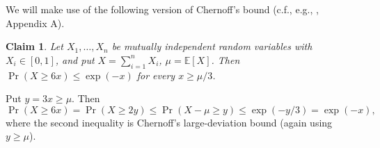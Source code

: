 \documentclass[11pt]{article}
\makeatletter
\renewenvironment{proof}[1][\proofname]
{\par\pushQED{\qed}
	\normalfont\topsep6\p@\@plus6\p@\relax\trivlist
	\item[\hskip\labelsep\bfseries#1\@addpunct{.}]
	\ignorespaces}
{\popQED\endtrivlist\@endpefalse}
\newtheorem{theo}{Theorem}[section]
\newtheorem{theo}{Theorem}[section]
\newtheorem{claim}[theo]{Claim}
\newcommand{\Ex}{\mathbb{E}}
\makeatother
\begin{document}
We will make use of the following version of Chernoff's bound
(c.f., e.g., \cite{AS}, Appendix A).
\begin{claim}\label{claim:Chernoff}
	Let $X_1,\ldots,X_n$ be mutually independent random variables with $X_i \in [0,1]$,
	and put $X=\sum_{i=1}^n X_i$, $\mu = \Ex[X]$.
	Then $\Pr(X \ge 6x) \le \exp(-x)$ for every $x \ge \mu/3$.
\end{claim}
\begin{proof}
	Put $y = 3x \ge \mu$. Then
	$\Pr(X \ge 6x) = \Pr(X \ge 2y) \le \Pr(X-\mu \ge y) \le \exp(-y/3) = \exp(-x),$
	where the second inequality is Chernoff's large-deviation bound (again using $y \ge \mu$).
\end{proof}
\end{document}
